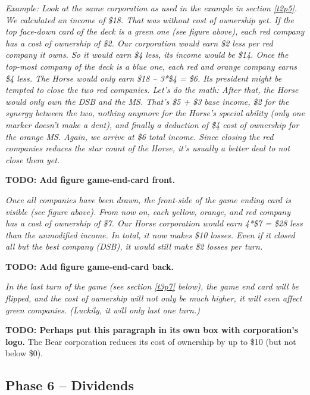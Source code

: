 \documentclass[10pt,final]{report}
\begin{document}
\begin{multicols}{2}
\emph{Example: Look at the same corporation as used in the example in
  section \ref{t2p5}. We calculated an income of \$18. That was
  without cost of ownership yet. If the top face-down card of the deck
  is a green one (see figure above), each red company has a cost of
  ownership of \$2. Our corporation would earn \$2 less per red
  company it owns. So it would earn \$4 less, its income would be
  \$14. Once the top-most company of the deck is a blue one, each red
  and orange company earns \$4 less. The Horse would only earn \$18 --
  3*\$4 = \$6. Its president might be tempted to close the two red
  companies. Let's do the math: After that, the Horse would only own
  the DSB and the MS. That's \$5 + \$3 base income, \$2 for the
  synergy between the two, nothing anymore for the Horse's special
  ability (only one marker doesn't make a dent), and finally a
  deduction of \$4 cost of ownership for the orange MS. Again, we
  arrive at \$6 total income. Since closing the red companies reduces
  the star count of the Horse, it's usually a better deal to not close
  them yet.}

\textbf{TODO: Add figure game-end-card front.}

\emph{Once all companies have been drawn, the front-side of the game
  ending card is visible (see figure above). From now on, each yellow,
  orange, and red company has a cost of ownership of \$7. Our Horse
  corporation would earn 4*\$7 = \$28 less than the unmodified
  income. In total, it now makes \$10 losses. Even if it closed all
  but the best company (DSB), it would still make \$2 losses per
  turn.}

\textbf{TODO: Add figure game-end-card back.}

\emph{In the last turn of the game (see section \ref{t3p7} below),
  the game end card will be flipped, and the cost of ownership will
  not only be much higher, it will even affect green companies. (Luckily,
  it will only last one turn.)}

\textbf{TODO: Perhaps put this paragraph in its own box with
  corporation's logo.} The Bear corporation reduces its cost of
ownership by up to \$10 (but not below \$0).

\subsection{Phase 6 -- Dividends}


\end{multicols}
\end{document}

